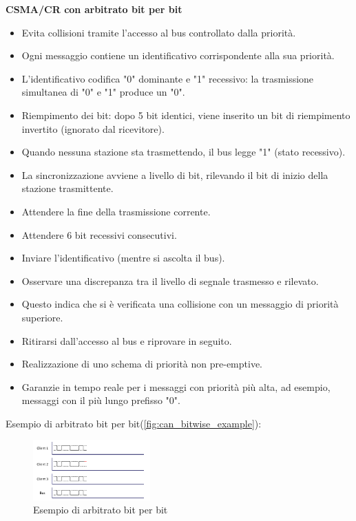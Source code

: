 \textbf{CSMA/CR con arbitrato bit per bit}
\begin{itemize}
    \item Evita collisioni tramite l'accesso al bus controllato dalla priorità.
    \item Ogni messaggio contiene un identificativo corrispondente alla sua priorità.
    \item L'identificativo codifica "0" dominante e "1" recessivo: la trasmissione simultanea di "0" e "1" produce un "0".
    \item Riempimento dei bit: dopo 5 bit identici, viene inserito un bit di riempimento invertito (ignorato dal ricevitore).
    \item Quando nessuna stazione sta trasmettendo, il bus legge "1" (stato recessivo).
    \item La sincronizzazione avviene a livello di bit, rilevando il bit di inizio della stazione trasmittente.
    \item Attendere la fine della trasmissione corrente.
    \item Attendere 6 bit recessivi consecutivi.
    \item Inviare l'identificativo (mentre si ascolta il bus).
    \item Osservare una discrepanza tra il livello di segnale trasmesso e rilevato.
    \item Questo indica che si è verificata una collisione con un messaggio di priorità superiore.
    \item Ritirarsi dall'accesso al bus e riprovare in seguito.
    \item Realizzazione di uno schema di priorità non pre-emptive.
    \item Garanzie in tempo reale per i messaggi con priorità più alta, ad esempio, messaggi con il più lungo prefisso "0".
\end{itemize}



Esempio di arbitrato bit per bit(\autoref{fig:can_bitwise_example}):
\begin{figure}[!ht]
  \centering
  \includegraphics[width=0.4\textwidth]{./images/can_bitwise_example.png}
  \caption{Esempio di arbitrato bit per bit}
  \label{fig:can_bitwise_example}
\end{figure}

